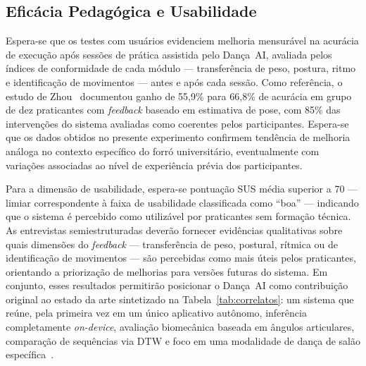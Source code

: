 \subsection{Eficácia Pedagógica e Usabilidade}
\label{sub:res_pedagogia}

Espera-se que os testes com usuários evidenciem melhoria mensurável na acurácia de execução
após sessões de prática assistida pelo Dança~AI, avaliada pelos índices de conformidade de
cada módulo --- transferência de peso, postura, ritmo e identificação de movimentos --- antes
e após cada sessão. Como referência, o estudo de
Zhou~\cite{stanford_ai_dance_coaching} documentou ganho de 55,9\% para 66,8\% de acurácia
em grupo de dez praticantes com \textit{feedback} baseado em estimativa de pose, com 85\% das
intervenções do sistema avaliadas como coerentes pelos participantes. Espera-se que os dados
obtidos no presente experimento confirmem tendência de melhoria análoga no contexto específico
do forró universitário, eventualmente com variações associadas ao nível de experiência prévia
dos participantes.

Para a dimensão de usabilidade, espera-se pontuação SUS média superior a 70 --- limiar
correspondente à faixa de usabilidade classificada como ``boa'' --- indicando que o sistema é
percebido como utilizável por praticantes sem formação técnica. As entrevistas semiestruturadas
deverão fornecer evidências qualitativas sobre quais dimensões do \textit{feedback} ---
transferência de peso, postural, rítmica ou de identificação de movimentos --- são
percebidas como mais úteis pelos praticantes, orientando a priorização de melhorias para
versões futuras do sistema. Em conjunto, esses resultados permitirão posicionar o Dança~AI
como contribuição original ao estado da arte sintetizado na
Tabela~\ref{tab:correlatos}: um sistema que reúne, pela primeira vez em um único aplicativo
autônomo, inferência completamente \textit{on-device}, avaliação biomecânica baseada em
ângulos articulares, comparação de sequências via DTW e foco em uma modalidade de dança de
salão específica~\cite{THARATIPYAKUL2024e36589}.
